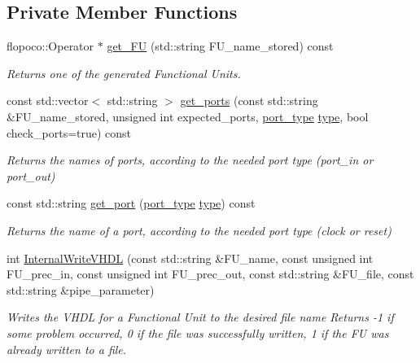 \subsection*{Private Member Functions}
\begin{DoxyCompactItemize}
\item 
flopoco\+::\+Operator $\ast$ \hyperlink{classflopoco__wrapper_ab45f79d64c8bd0e1d73dc7833a6d15ad}{get\+\_\+\+FU} (std\+::string F\+U\+\_\+name\+\_\+stored) const
\begin{DoxyCompactList}\small\item\em Returns one of the generated Functional Units. \end{DoxyCompactList}\item 
const std\+::vector$<$ std\+::string $>$ \hyperlink{classflopoco__wrapper_ae65f581fe20c9fa4595857e5f296c619}{get\+\_\+ports} (const std\+::string \&F\+U\+\_\+name\+\_\+stored, unsigned int expected\+\_\+ports, \hyperlink{classflopoco__wrapper_af27fdf36f1f15e00384aeee46b6de5ac}{port\+\_\+type} \hyperlink{classflopoco__wrapper_aa187461f66472ae2d77d3c8425895de7}{type}, bool check\+\_\+ports=true) const
\begin{DoxyCompactList}\small\item\em Returns the names of ports, according to the needed port type (port\+\_\+in or port\+\_\+out) \end{DoxyCompactList}\item 
const std\+::string \hyperlink{classflopoco__wrapper_a582a468cce4977d1a2af23e5f719af2c}{get\+\_\+port} (\hyperlink{classflopoco__wrapper_af27fdf36f1f15e00384aeee46b6de5ac}{port\+\_\+type} \hyperlink{classflopoco__wrapper_aa187461f66472ae2d77d3c8425895de7}{type}) const
\begin{DoxyCompactList}\small\item\em Returns the name of a port, according to the needed port type (clock or reset) \end{DoxyCompactList}\item 
int \hyperlink{classflopoco__wrapper_afc229ae93b5772fadc22ead428f29036}{Internal\+Write\+V\+H\+DL} (const std\+::string \&F\+U\+\_\+name, const unsigned int F\+U\+\_\+prec\+\_\+in, const unsigned int F\+U\+\_\+prec\+\_\+out, const std\+::string \&F\+U\+\_\+file, const std\+::string \&pipe\+\_\+parameter)
\begin{DoxyCompactList}\small\item\em Writes the V\+H\+DL for a Functional Unit to the desired file name Returns -\/1 if some problem occurred, 0 if the file was successfully written, 1 if the FU was already written to a file. \end{DoxyCompactList}\item 

\end{DoxyCompactItemize}
